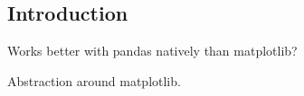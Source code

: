 
\subsection{Introduction}

Works better with pandas natively than matplotlib?

Abstraction around matplotlib.

